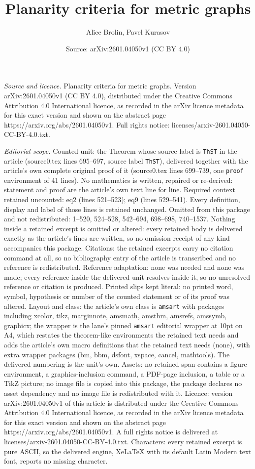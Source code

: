 \documentclass[10pt,a4paper]{amsart}
\title[Planarity criteria for metric graphs]{Planarity criteria for metric graphs}
\author{Alice Brolin, Pavel Kurasov}
\date{Source: arXiv:2601.04050v1 (CC BY 4.0)}
\begin{document}
\maketitle

\noindent\emph{Source and licence.} Planarity criteria for metric graphs. Version arXiv:2601.04050v1 (CC BY 4.0), distributed under the Creative Commons Attribution 4.0 International licence, as recorded in the arXiv licence metadata for this exact version and shown on the abstract page https://arxiv.org/abs/2601.04050v1. Full rights notice: licenses/arxiv-2601.04050-CC-BY-4.0.txt.\par\smallskip

\noindent\textit{Editorial scope.} Counted unit: the Theorem whose source label is \texttt{ThST} in the article (source0.tex lines 695--697, source label \texttt{ThST}), delivered together with the article's own complete original proof of it (source0.tex lines 699--739, one \texttt{proof} environment of 41 lines). No mathematics is written, repaired or re-derived: statement and proof are the article's own text line for line. Required context retained uncounted: eq2 (lines 521--523); eq9 (lines 529--541). Every definition, display and label of those lines is retained unchanged. Omitted from this package and not redistributed: 1--520, 524--528, 542--694, 698--698, 740--1537. Nothing inside a retained excerpt is omitted or altered: every retained body is delivered exactly as the article's lines are written, so no omission receipt of any kind accompanies this package. Citations: the retained excerpts carry no citation command at all, so no bibliography entry of the article is transcribed and no reference is redistributed. Reference adaptation: none was needed and none was made; every reference inside the delivered unit resolves inside it, so no unresolved reference or citation is produced. Printed slips kept literal: no printed word, symbol, hypothesis or number of the counted statement or of its proof was altered. Layout and class: the article's own class is \texttt{amsart} with packages including xcolor, tikz, marginnote, amsmath, amsthm, amsrefs, amssymb, graphicx; the wrapper is the lane's pinned \texttt{amsart} editorial wrapper at 10pt on A4, which restates the theorem-like environments the retained text needs and adds the article's own macro definitions that the retained text needs (none), with extra wrapper packages (bm, bbm, dsfont, xspace, cancel, mathtools). The delivered numbering is the unit's own. Assets: no retained span contains a figure environment, a graphics-inclusion command, a PDF-page inclusion, a table or a TikZ picture; no image file is copied into this package, the package declares no asset dependency and no image file is redistributed with it. Licence: version arXiv:2601.04050v1 of this article is distributed under the Creative Commons Attribution 4.0 International licence, as recorded in the arXiv licence metadata for this exact version and shown on the abstract page https://arxiv.org/abs/2601.04050v1. A full rights notice is delivered at licenses/arxiv-2601.04050-CC-BY-4.0.txt. Characters: every retained excerpt is pure ASCII, so the delivered engine, XeLaTeX with its default Latin Modern text font, reports no missing character.
\end{document}
